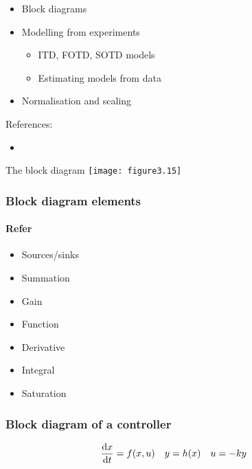 \documentclass{beamer-control}
\begin{document}

\begin{SUMMARY}
\begin{itemize}
\item Block diagrams
\item Modelling from experiments
\begin{itemize}
\item ITD, FOTD, SOTD models
\item Estimating models from data
\end{itemize}
\item Normalisation and scaling
\end{itemize}
\vfill References:
\begin{itemize}
\item {}
\end{itemize}
\end{SUMMARY}




\begin{frame}{The block diagram}
\texttt{[image: figure3.15]}
\end{frame}

\begin{frame}
\frametitle{Block diagram elements}
\framesubtitle{Refer }
\begin{itemize}
\item<alert@1> Sources/sinks
\item<alert@2> Summation
\item<alert@3> Gain
\item<alert@4> Function
\item<alert@5> Derivative
\item<alert@6> Integral
\item<alert@7> Saturation
\end{itemize}
\end{frame}

\begin{frame}
\frametitle{Block diagram of a controller}
\begin{align}
\frac{\mathrm{d} x}{\mathrm{d} t} &= f(x,u) & y &= h(x) & u &= -ky
\end{align}
\vspace*{0pt plus 1 filll}
\null
\end{frame}


\end{document}
